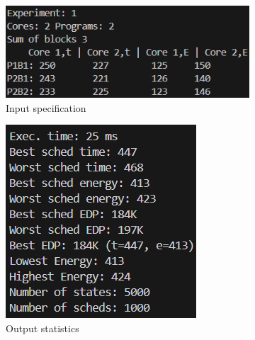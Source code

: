 \begin{figure}
    \centering
    \begin{subfigure}{0.32\textwidth}
        \includegraphics[width=\linewidth]{figs/inputScreen.png}
        \caption{Input specification}
        \label{fig:inputScreen}
    \end{subfigure}
    \hspace{3mm}
     \begin{subfigure}{0.24\textwidth}
        \includegraphics[width=\linewidth]{figs/OutputScreen.png}
        \caption{Output statistics}
        \label{fig:outputScreen}
    \end{subfigure} 
        \hspace{3mm}
     \begin{subfigure}{0.33\textwidth}

\end{subfigure}
\end{figure}
